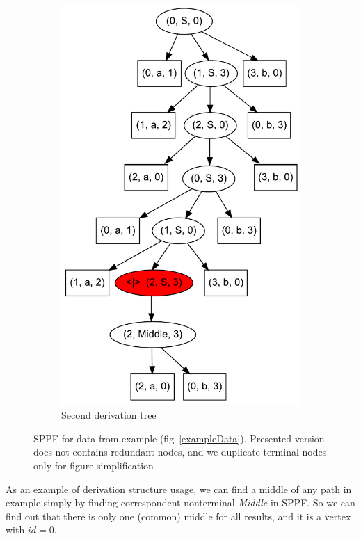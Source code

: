 \begin{figure}[ht]
\begin{center}
\begin{subfigure}[b]{0.3\textwidth}
        \includegraphics[width=\textwidth]{dot/AnBn_1.pdf}
        \caption{Second derivation tree}
        \label{tree2}        
    \end{subfigure}
    \caption{SPPF for data from example (fig~\ref{exampleData}). Presented version does not contains redundant nodes, and we duplicate terminal nodes only for figure simplification}
    \label{sppfSample}
    \end{center}                
\end{figure}

As an example of derivation structure usage, we can find a middle of any path in example simply by finding correspondent nonterminal \textit{Middle} in SPPF.
So we can find out that there is only one (common) middle for all results, and it is a vertex with $id = 0$.

